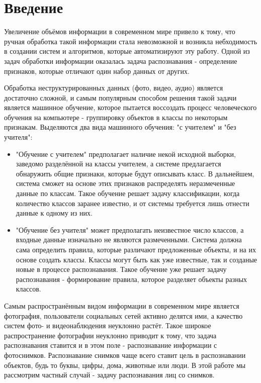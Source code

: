 \documentclass[12pt,a4paper]{article}
\begin{document}
\section{Введение}
Увеличение объёмов информации в современном мире привело к тому, что ручная обработка такой информации стала невозможной и возникла небходимость в создании систем и алгоритмов, которые автоматизируют эту работу. Одной из задач обработки информации оказалась задача распознавания - определение признаков, которые отличают один набор данных от других.

Обработка неструктурированных данных (фото, видео, аудио) является достаточно сложной, и самым популярным способом решения такой задачи является машинное обучение, которое пытается воссоздать процесс человеческого обучения на компьютере - группировку объектов в классы по некоторым признакам. Выделяются два вида машинного обучения: "с учителем" и "без учителя":
\begin{itemize}
    \item "Обучение с учителем" предполагает наличие некой исходной выборки, заведомо разделённой на классы учителем, а системе предлагается обнаружить общие признаки, которые будут описывать класс. В дальнейшем, система сможет на основе этих признаков распределять неразмеченные данные по классам. Такое обучение решает задачу классификации, когда количество классов заранее известно, и от системы требуется лишь отнести данные к одному из них.
    \item "Обучение без учителя" может предполагать неизвестное число классов, а входные данные изначально не являются размеченными. Система должна сама определить правила, которые различают предложенные объекты, и на их основе создать классы. Классы могут быть как уже известные, так и созданые новые в процессе распознавания. Такое обучение уже решает задачу распознавания - формирование правила, которое разделяет объекты разных классов.
\end{itemize}

Самым распространённым видом информации в современном мире является фотография, пользователи социальных сетей активно делятся ими, а качество систем фото- и видеонаблюдения неуклонно растёт. Такое широкое распространение фотографии неуклонно приводит к тому, что задача распознавания ставится и в этом поле - распознавание информации с фотоснимков. Распознавание снимков чаще всего ставит цель в распознавании объектов, будь то буквы, цифры, дома, животные или люди. В этой работе мы рассмотрим частный случай - задачу распознавания лиц со снимков.
\end{document}
